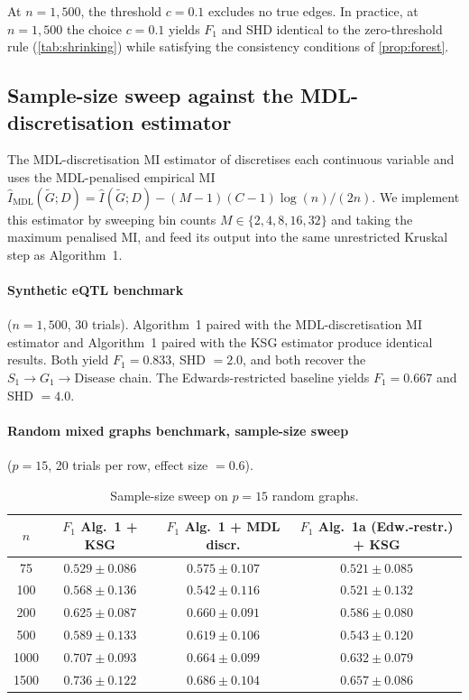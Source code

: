 At $n = 1{,}500$, the threshold $c = 0.1$ excludes no true edges. In
practice, at $n = 1{,}500$ the choice $c = 0.1$ yields $F_1$ and
SHD identical to the zero-threshold rule (\cref{tab:shrinking})
while satisfying the consistency conditions of
\cref{prop:forest}.

\subsection{Sample-size sweep against the MDL-discretisation estimator}
\label{subsec:suzuki}

The MDL-discretisation MI estimator of \citet{suzuki2017chow}
discretises each continuous variable and uses the MDL-penalised
empirical MI
$\hat{I}_{\mathrm{MDL}}(\tilde{G}; D) = \hat{I}(\tilde{G}; D) -
(M-1)(C-1)\log(n)/(2n)$. We implement this estimator by sweeping bin
counts $M \in \{2, 4, 8, 16, 32\}$ and taking the maximum penalised
MI, and feed its output into the same unrestricted Kruskal step as
Algorithm~1.

\paragraph{Synthetic eQTL benchmark} ($n = 1{,}500$, 30 trials).
Algorithm~1 paired with the MDL-discretisation MI estimator and
Algorithm~1 paired with the KSG estimator produce identical
results. Both yield $F_1 = 0.833$, SHD $= 2.0$, and both recover the
$S_1 \to G_1 \to \text{Disease}$ chain. The Edwards-restricted
baseline yields $F_1 = 0.667$ and SHD $= 4.0$.

\paragraph{Random mixed graphs benchmark, sample-size sweep}
($p = 15$, 20 trials per row, effect size $= 0.6$).

\begin{table}[ht]
\centering
\caption{Sample-size sweep on $p = 15$ random graphs.}
\label{tab:suzuki_n}
\small
\begin{tabular}{cccc}
\toprule
$n$ & $F_1$ Alg.~1 + KSG & $F_1$ Alg.~1 + MDL discr. & $F_1$ Alg.~1a (Edw.-restr.) + KSG \\
\midrule
75    & $0.529 \pm 0.086$         & $\mathbf{0.575 \pm 0.107}$ & $0.521 \pm 0.085$ \\
100   & $0.568 \pm 0.136$         & $0.542 \pm 0.116$          & $0.521 \pm 0.132$ \\
200   & $0.625 \pm 0.087$         & $0.660 \pm 0.091$          & $0.586 \pm 0.080$ \\
500   & $0.589 \pm 0.133$         & $0.619 \pm 0.106$          & $0.543 \pm 0.120$ \\
1000  & $0.707 \pm 0.093$         & $0.664 \pm 0.099$          & $0.632 \pm 0.079$ \\
1500  & $\mathbf{0.736 \pm 0.122}$ & $0.686 \pm 0.104$          & $0.657 \pm 0.086$ \\
\bottomrule
\end{tabular}
\end{table}

